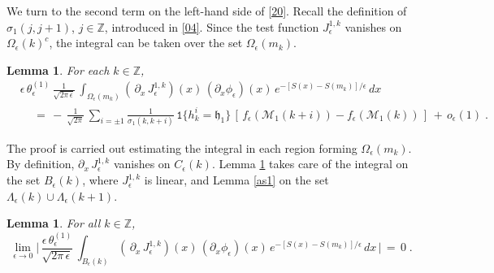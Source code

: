 \documentclass[reqno]{amsart}
\theoremstyle{plain}
\newtheorem{lemma}[theorem]{Lemma}
\theoremstyle{definition}
\newcommand{\mf}[1]{{\mathfrak #1}}
\newcommand{\bb}[1]{{\mathbb #1}}
\newcommand{\ms}[1]{{\mathscr #1}}
\newcommand{\mtt}[1]{{\mathtt #1}}
\newcounter{as}[section]
\newcommand{\<}{\langle}
\renewcommand{\>}{\rangle}
\begin{document}
We turn to the second term on the left-hand side of \eqref{20}. Recall
the definition of $\sigma_1(j,j+1)$, $j\in \bb Z$, introduced in
\eqref{04}. Since the test function $J_{\epsilon}^{1,k}$ vanishes on
$\Omega_\epsilon (k)^c$, the integral can be taken over the set
$\Omega_{\epsilon} (m_{k})$.

\begin{lemma}
\label{l03}
For each $k\in \bb Z$,
\begin{equation*}
\begin{aligned}
& \epsilon \, \theta^{(1)}_{\epsilon}\, \frac{1}{\sqrt{2\pi\,\epsilon}}\,
\int_{\Omega_{\epsilon} (m_{k})} (\, \partial_x \,
J_{\epsilon}^{1,k} )(x) \, (\partial_x \phi_{\epsilon}) (x) \,
e^{-[S(x)-S(m_k)]/\epsilon} \, dx
\\
&\quad \,=\, -\, \frac{1}{\sqrt{2\pi}}\, \sum_{i=\pm 1}
\frac{1}{\sigma_1(k,k+i)}\, \mtt 1 \{h^i_k = \mf h_1\}
\, [\, f_{\epsilon}(\ms M_1(k+i))- f_{\epsilon}(\ms M_1(k))\,]
\,+\, o_\epsilon(1)  \;. 
\end{aligned}
\end{equation*}
\end{lemma}

The proof is carried out estimating the integral in each region
forming $\Omega_{\epsilon} (m_{k})$. By definition,
$\partial_x \, J_{\epsilon}^{1,k}$ vanishes on $C_\epsilon
(k)$. Lemma \ref{as2} takes care of the integral on the set
$B_\epsilon(k)$, where $J^{1,k}_{\epsilon}$ is linear, and Lemma
\ref{as1} on the set
$\Lambda_{\epsilon}(k) \cup \Lambda_{\epsilon}(k+1)$.

\begin{lemma}
\label{as2}
For all $k\in \bb Z$,
\begin{equation*}
\lim_{\epsilon\to 0}
\Big|\, \frac{\epsilon\, \theta_{\epsilon}^{(1)}}{\sqrt{2\pi\, \epsilon}}\,
\int_{B_\epsilon  (k)} (\, \partial_x \,
J_{\epsilon}^{1,k} )(x) \, (\partial_x \phi_{\epsilon}) (x) \,
e^{-[S(x)-S(m_k)]/\epsilon} \, dx  \, \Big| \,=\, 0\;.
\end{equation*}
\end{lemma}
\end{document}
